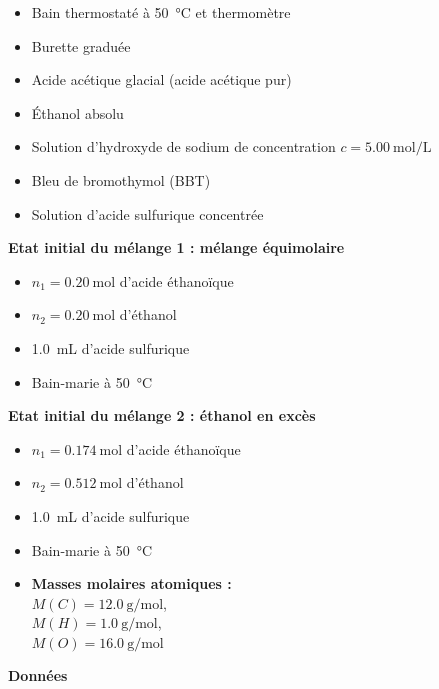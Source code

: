 \documentclass[a4paper,11pt,fleqn]{article}%
\begin{document}
\begin{figure}[h!]
\begin{minipage}{.5\linewidth}
\begin{itemize}
        \item Bain thermostaté à \SI{50}{\celsius} et thermomètre
        \item Burette graduée
        \item Acide acétique glacial (acide acétique pur)
        \item Éthanol absolu
        \item Solution d'hydroxyde de sodium de concentration $c=\SI{5,00}{\mole\per\liter}$
        \item Bleu de bromothymol (BBT)
        \item Solution d'acide sulfurique concentrée
    \end{itemize}
    \label{fig:doc2}
    \end{minipage}
\end{figure}
\begin{figure}[h!]
    \begin{minipage}{.5\linewidth}
    \caption*{\textbf{Document 3 : Conditions initiales}}
    \textbf{Etat initial du mélange 1 : mélange équimolaire}
    \begin{itemize}
        \item $n_1 = \SI{0,20}{\mole}$ d'acide éthanoïque 
        \item $n_2 = \SI{0,20}{\mole}$ d'éthanol 
        \item \SI{1,0}{mL} d'acide sulfurique
        \item Bain-marie à \SI{50}{\celsius}
    \end{itemize}
    \textbf{Etat initial du mélange 2 : éthanol en excès}
    \begin{itemize}
        \item $n_1 = \SI{0,174}{\mole}$ d'acide éthanoïque 
        \item $n_2 = \SI{0,512}{\mole}$ d'éthanol 
        \item \SI{1,0}{mL} d'acide sulfurique
        \item Bain-marie à \SI{50}{\celsius}
    \end{itemize}
    \label{fig:doc3}
    \end{minipage}
    \begin{minipage}{.5\linewidth}
    \caption*{\textbf{Données}}
    \begin{itemize}
        \item \textbf{Masses molaires atomiques : }\\ $M(C) = \SI{12,0}{\gram\per\mole}$,\\ $M(H) = \SI{1,0}{\gram\per\mole}$,\\ $M(O) = \SI{16,0}{\gram\per\mole}$

\end{itemize}
\end{minipage}
\end{figure}
\end{document}
